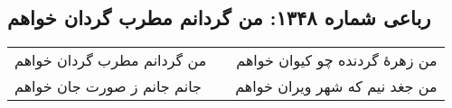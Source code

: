 \begin{center}
\section*{رباعی شماره ۱۳۴۸: من گردانم مطرب گردان خواهم}
\label{sec:1348}
\begin{longtable}{l p{0.5cm} r}
من گردانم مطرب گردان خواهم
&&
من زهرهٔ گردنده چو کیوان خواهم
\\
جانم جانم ز صورت جان خواهم
&&
من جغد نیم که شهر ویران خواهم
\\
\end{longtable}
\end{center}
